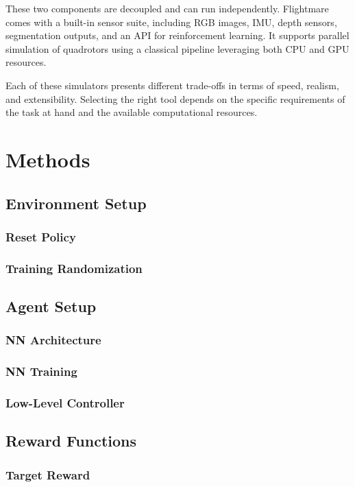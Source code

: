 \documentclass[a4paper,oneside]{book}
\theoremstyle{definition}
\begin{document}
These two components are decoupled and can run independently. Flightmare comes with a built-in sensor suite, including RGB images, IMU, depth sensors, segmentation outputs, and an API for reinforcement learning. It supports parallel simulation of quadrotors using a classical pipeline leveraging both CPU and GPU resources.

\vspace{1em}

Each of these simulators presents different trade-offs in terms of speed, realism, and extensibility. Selecting the right tool depends on the specific requirements of the task at hand and the available computational resources.


\chapter{Methods}
\section{Environment Setup}
\subsection{Reset Policy}
\subsection{Training Randomization}

\section{Agent Setup}
\subsection{NN Architecture}
\subsection{NN Training}
\subsection{Low-Level Controller}

\section{Reward Functions}
\subsection{Target Reward}
\end{document}
